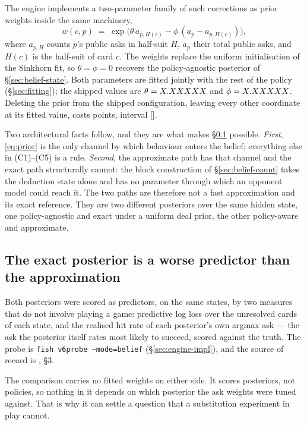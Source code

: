 The engine implements a two-parameter family of such corrections as prior weights
inside the same machinery,
\begin{equation}
  w(c,p) \;=\; \exp\!\bigl(\theta\, a_{p,H(c)} - \phi\,(a_p - a_{p,H(c)})\bigr),
  \label{eq:prior}
\end{equation}
where $a_{p,H}$ counts $p$'s public asks in half-suit $H$, $a_p$ their total
public asks, and $H(c)$ is the half-suit of card $c$. The weights replace the
uniform initialisation of the Sinkhorn fit, so $\theta = \phi = 0$ recovers the
policy-agnostic posterior of \S\ref{sec:belief-state}. Both parameters are
fitted jointly with the rest of the policy (\S\ref{sec:fitting}); the shipped
values are $\theta = X.XXXXX{}$ and $\phi = X.XXXXX{}$. Deleting
the prior from the shipped configuration, leaving every other coordinate at its
fitted value, costs \vsixPriorDeleteCost{} points, interval
[\vsixPriorDeleteCI{}].

Two architectural facts follow, and they are what makes
\S\ref{sec:belief-exactworse} possible. \emph{First}, \eqref{eq:prior} is the
only channel by which behaviour enters the belief; everything else in
(C1)--(C5) is a rule. \emph{Second}, the approximate path has that channel and
the exact path structurally cannot: the block construction of
\S\ref{sec:belief-count} takes the deduction state alone and has no parameter
through which an opponent model could reach it. The two paths are therefore not
a fast approximation and its exact reference. They are two different posteriors
over the same hidden state, one policy-agnostic and exact under a uniform deal
prior, the other policy-aware and approximate.

\subsection{The exact posterior is a worse predictor than the approximation}
\label{sec:belief-exactworse}

Both posteriors were scored as predictors, on the same states, by two measures
that do not involve playing a game: predictive log loss over the unresolved cards
of each state, and the realised hit rate of each posterior's own argmax ask ---
the ask the posterior itself rates most likely to succeed, scored against the
truth. The probe is \texttt{fish v6probe --mode=belief}
(\S\ref{sec:engine-impl}), and the source of record is
, \S3.

The comparison carries no fitted weights on either side. It scores posteriors,
not policies, so nothing in it depends on which posterior the ask weights were
tuned against. That is why it can settle a question that a substitution
experiment in play cannot.

